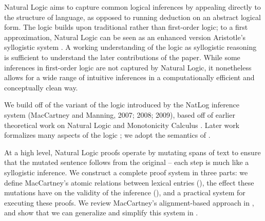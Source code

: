 Natural Logic aims to capture common logical
  inferences by appealing directly to the structure of language,
  as opposed to running deduction on an abstract logical form.
The logic builds upon traditional rather than first-order logic;
  to a first approximation, Natural Logic can be seen as
  an enhanced version Aristotle's syllogistic system
  \cite{key:2008vanbenthem-natlog}.
A working understanding of the logic as syllogistic reasoning
  is sufficient to understand the later contributions of the paper.
While some inferences in first-order logic are not captured by 
  Natural Logic,
  it nonetheless allows for a wide range of intuitive inferences in
  a computationally efficient and conceptually clean way.

We build off of the variant of the logic introduced by
  the NatLog inference system (MacCartney and Manning, 2007; 2008; 2009),
  \nocite{key:2007maccartney-natlog}
  \nocite{key:2008maccartney-natlog}
  \nocite{key:2009maccartney-natlog}
  based off of earlier theoretical work on Natural Logic and 
  Monotonicity Calculus
  \cite{key:1986benthem-natlog,key:1991valencia-natlog}.
Later work formalizes many aspects of the logic
  \cite{key:2012icard-natlog,key:2013djalali-natlog};
  we adopt the semantics of
  .

At a high level, Natural Logic proofs operate by mutating spans of text
  to ensure that the mutated sentence follows from the
  original -- each step is much like a syllogistic inference.
We construct a complete proof system in three parts:
  we define MacCartney's atomic relations between lexical entries
  (), the effect these mutations have
  on the validity of the inference (),
  and a practical system for executing these proofs.
We review MacCartney's alignment-based approach in
  , and show that we can generalize and
  simplify this system in .

